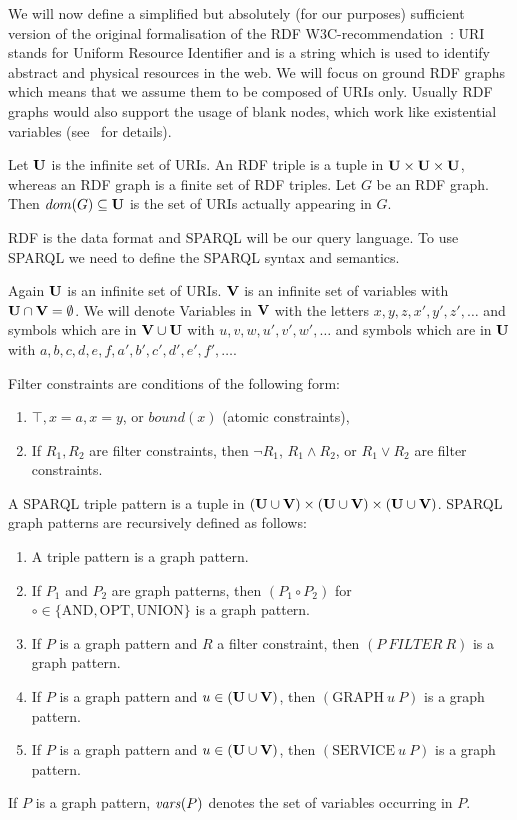 We will now define a simplified but absolutely (for our purposes) sufficient version of the
original formalisation of the RDF W3C-recommendation~\cite{rdf}:
URI stands for Uniform Resource Identifier and is a string which is used to identify
abstract and physical resources in the web. 
We will focus on ground RDF graphs which means that we assume them to be composed of URIs only.
Usually RDF graphs would also support the usage of blank nodes, which work like
existential variables (see~\cite{hogan2014everything} for details).

\begin{definition}[RDF]
	Let $\mathbf{U}$ is the infinite set of URIs. An RDF triple is a tuple in $\mathbf{U} \times \mathbf{U} \times \mathbf{U}$, whereas an
	RDF graph is a finite set of RDF triples. Let $G$ be an RDF graph. Then
	$dom(G) \subseteq \mathbf{U}$ is the set of URIs actually appearing in $G$.
\end{definition}

RDF is the data format and SPARQL will be our query language. To use SPARQL we need
to define the SPARQL syntax and semantics.

\begin{definition}
	Again $\mathbf{U}$ is an infinite set of URIs. 
	$\mathbf{V}$ is an infinite set of variables with $\mathbf{U} \cap \mathbf{V} = \emptyset$. 
	We will denote Variables in $\mathbf{V}$ with the letters $x,y,z,x',y',z',\dots$ and
	symbols which are in $\mathbf{V} \cup \mathbf{U}$ with $u,v,w,u',v',w',\dots$ and
	symbols which are in $\mathbf{U}$ with $a,b,c,d,e,f,a',b',c',d',e',f',\dots$.
	
	Filter constraints are conditions of the following form:
	\begin{enumerate}
		\item $\top, x=a, x=y$, or $bound(x)$ (atomic constraints),
		\item If $R_1, R_2$ are filter constraints, then $\neg R_1$, $R_1 \land R_2$,
			or $R_1 \lor R_2$ are filter constraints.
	\end{enumerate}

	A SPARQL triple pattern is a tuple in  $(\mathbf{U} \cup \mathbf{V}) \times (\mathbf{U} \cup \mathbf{V}) \times (\mathbf{U} \cup \mathbf{V})$. 
	SPARQL graph patterns are recursively defined as follows:
	\begin{enumerate}
		\item A triple pattern is a graph pattern.
		\item If $P_1$ and $P_2$ are graph patterns, then $(P_1  \circ P_2)$ for
			$\circ \in \{ \mbox{AND}, \mbox{OPT}, \mbox{UNION}\}$ is a graph pattern.
		\item If $P$ is a graph pattern and $R$ a filter constraint, then $(P \ FILTER \ R)$ is a graph pattern.
		\item If $P$ is a graph pattern and $u \in (\mathbf{U} \cup \mathbf{V})$, then $(\mbox{GRAPH} \  u \ P)$ is a graph pattern.
		\item If $P$ is a graph pattern and $u \in (\mathbf{U} \cup \mathbf{V})$, then $(\mbox{SERVICE} \  u \ P)$ is a graph pattern.
	\end{enumerate}
If $P$ is a graph pattern, $\mathit{vars}(P)$ denotes the set of variables occurring in $P$.
\end{definition}

